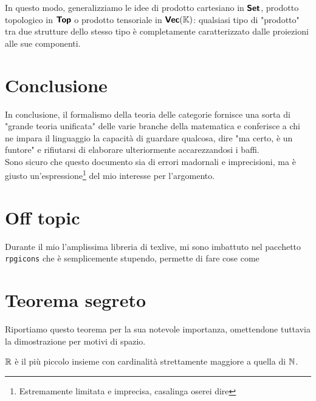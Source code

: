 \documentclass{article}
\begin{document}
In questo modo, generalizziamo le idee di prodotto cartesiano in $\text{\sffamily\textbf{Set}}$, prodotto topologico in $\text{\sffamily\textbf{Top}}$ o prodotto tensoriale in $\text{\sffamily\textbf{Vec}}(\mathbb{K})$: qualsiasi tipo di "prodotto" tra due strutture dello stesso tipo è completamente caratterizzato dalle proiezioni alle sue componenti.

\section{Conclusione}
\label{sec:Ending}

In conclusione, il formalismo della teoria delle categorie fornisce una sorta di "grande teoria unificata" delle varie branche della matematica e conferisce a chi ne impara il linguaggio la capacità di guardare qualcosa, dire "ma certo, è un funtore" e rifiutarsi di elaborare ulteriormente accarezzandosi i baffi.\\
Sono sicuro che questo documento sia  di errori madornali e imprecisioni, ma è giusto un'espressione\footnote{Estremamente limitata e imprecisa, casalinga oserei dire} del mio interesse per l'argomento.

\section{Off topic}
\label{sec:OffTopic}

Durante il mio  l'amplissima libreria di texlive, mi sono imbattuto nel pacchetto \texttt{rpgicons} che è semplicemente stupendo, permette di fare cose come 

\section{Teorema segreto}
Riportiamo questo teorema per la sua notevole importanza, omettendone tuttavia la dimostrazione per motivi di spazio.
\begin{theorem}
    $\mathbb{R}$ è il più piccolo insieme con cardinalità strettamente maggiore a quella di $\mathbb{N}$.\cite{Menegolli2024}
\end{theorem}

\printbibliography
\end{document}

